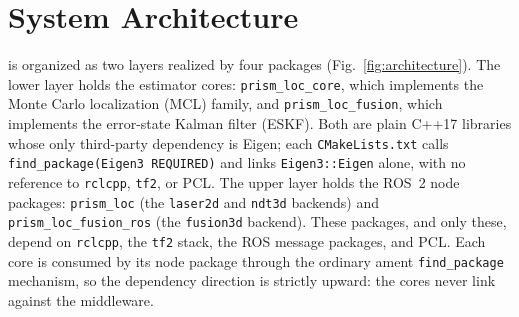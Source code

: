 \section{System Architecture}\label{sec:architecture}

\prismloc{} is organized as two layers realized by four packages
(Fig.~\ref{fig:architecture}). The lower layer holds the estimator cores:
\texttt{prism\_loc\_core}, which implements the Monte Carlo
localization (MCL) family, and \texttt{prism\_loc\_fusion}, which
implements the error-state Kalman filter (ESKF). Both are plain
C++17 libraries whose only third-party dependency is Eigen; each
\texttt{CMakeLists.txt} calls \texttt{find\_package(Eigen3 REQUIRED)}
and links \texttt{Eigen3::Eigen} alone, with no reference to
\texttt{rclcpp}, \texttt{tf2}, or PCL. The upper layer holds the ROS~2
node packages: \texttt{prism\_loc} (the \texttt{laser2d} and
\texttt{ndt3d} backends) and \texttt{prism\_loc\_fusion\_ros} (the
\texttt{fusion3d} backend). These packages, and only these, depend on
\texttt{rclcpp}, the \texttt{tf2} stack, the ROS message packages, and
PCL. Each core is consumed by its node package through the ordinary
ament \texttt{find\_package} mechanism, so the dependency direction is
strictly upward: the cores never link against the middleware.



